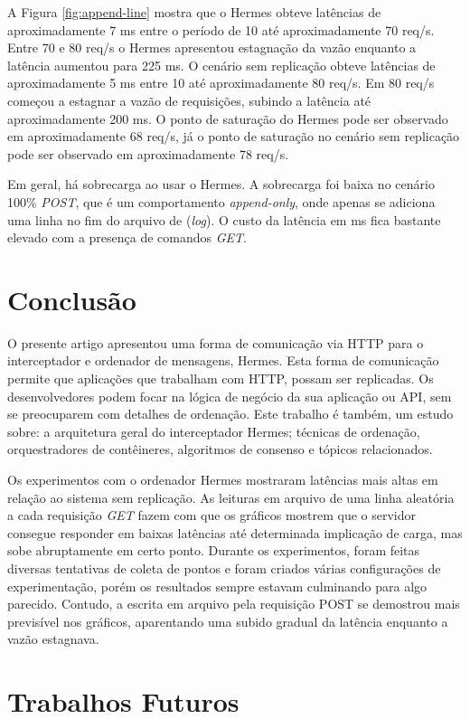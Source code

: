 \documentclass[12pt]{article}
\begin{document}
A Figura \ref{fig:append-line} mostra que o Hermes obteve latências de aproximadamente 7 ms entre o período de 10 até aproximadamente 70 req/s. Entre 70 e 80 req/s o Hermes apresentou estagnação da vazão enquanto a latência aumentou para 225 ms. O cenário sem replicação obteve latências de aproximadamente 5 ms entre 10 até aproximadamente 80 req/s. Em 80 req/s começou a estagnar a vazão de requisições, subindo a latência até aproximadamente 200 ms. O ponto de saturação do Hermes pode ser observado em aproximadamente 68 req/s, já o ponto de saturação no cenário sem replicação pode ser observado em aproximadamente 78 req/s.

Em geral, há sobrecarga ao usar o Hermes. A sobrecarga foi baixa no cenário 100\% \textit{POST}, que é um comportamento \textit{append-only}, onde apenas se adiciona uma linha no fim do arquivo de (\textit{log}). O custo da latência em ms fica bastante elevado com a presença de comandos \textit{GET}.

\section{Conclusão}

O presente artigo apresentou uma forma de comunicação via HTTP para o interceptador e ordenador de mensagens, Hermes. Esta forma de comunicação permite que aplicações que trabalham com HTTP, possam ser replicadas. Os desenvolvedores podem focar na lógica de negócio da sua aplicação ou {API}, sem se preocuparem com detalhes de ordenação. Este trabalho é também, um estudo sobre: a arquitetura geral do interceptador Hermes; técnicas de ordenação, orquestradores de contêineres, algoritmos de consenso e tópicos relacionados.

Os experimentos com o ordenador Hermes mostraram latências mais altas em relação ao sistema sem replicação. As leituras em arquivo de uma linha aleatória a cada requisição \textit{GET} fazem com que os gráficos mostrem que o servidor consegue responder em baixas latências até determinada implicação de carga, mas sobe abruptamente em certo ponto. Durante os experimentos, foram feitas diversas tentativas de coleta de pontos e foram criados várias configurações de experimentação, porém os resultados sempre estavam culminando para algo parecido. Contudo, a escrita em arquivo pela requisição POST se demostrou mais previsível nos gráficos, aparentando uma subido gradual da latência enquanto a vazão estagnava.

\section{Trabalhos Futuros}
\end{document}
